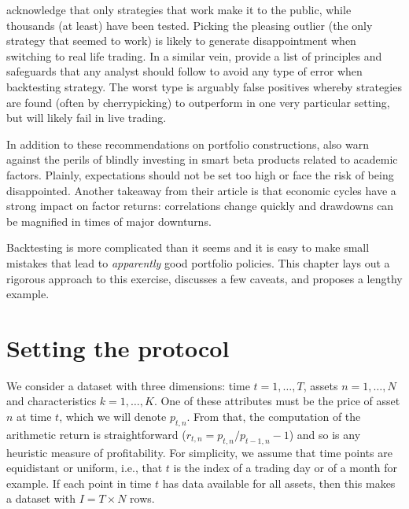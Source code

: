 \documentclass[]{krantz}
\theoremstyle{definition}
\theoremstyle{definition}
\theoremstyle{definition}
\theoremstyle{remark}
\begin{document}
\citet{fabozzi2018being} acknowledge that only strategies that work make
it to the public, while thousands (at least) have been tested. Picking
the pleasing outlier (the only strategy that seemed to work) is likely
to generate disappointment when switching to real life trading. In a
similar vein, \citet{arnott2019backtesting} provide a list of principles
and safeguards that any analyst should follow to avoid any type of error
when backtesting strategy. The worst type is arguably false positives
whereby strategies are found (often by cherrypicking) to outperform in
one very particular setting, but will likely fail in live trading.

In addition to these recommendations on portfolio constructions,
\citet{arnott2019alice} also warn against the perils of blindly
investing in smart beta products related to academic factors. Plainly,
expectations should not be set too high or face the risk of being
disappointed. Another takeaway from their article is that economic
cycles have a strong impact on factor returns: correlations change
quickly and drawdowns can be magnified in times of major downturns.

Backtesting is more complicated than it seems and it is easy to make
small mistakes that lead to \emph{apparently} good portfolio policies.
This chapter lays out a rigorous approach to this exercise, discusses a
few caveats, and proposes a lengthy example.

\hypertarget{protocol}{%
\section{Setting the protocol}\label{protocol}}

We consider a dataset with three dimensions: time \(t=1,\dots,T\),
assets \(n=1,\dots,N\) and characteristics \(k=1,\dots,K\). One of these
attributes must be the price of asset \(n\) at time \(t\), which we will
denote \(p_{t,n}\). From that, the computation of the arithmetic return
is straightforward (\(r_{t,n}=p_{t,n}/p_{t-1,n}-1\)) and so is any
heuristic measure of profitability. For simplicity, we assume that time
points are equidistant or uniform, i.e., that \(t\) is the index of a
trading day or of a month for example. If each point in time \(t\) has
data available for all assets, then this makes a dataset with
\(I=T\times N\) rows.
\end{document}

